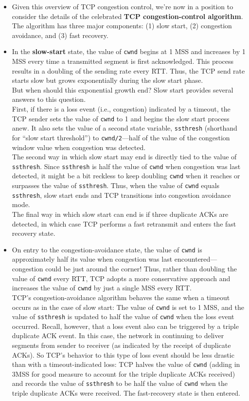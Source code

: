 \begin{itemize}
\item
Given this overview of TCP congestion control, we're now in a position to consider the details of the celebrated \textbf{TCP congestion-control algorithm}. The algorithm has three major components: (1) slow start, (2) congestion avoidance, and (3) fast recovery.

\item
In the \textbf{slow-start} state, the value of \texttt{cwnd} begins at 1 MSS and increases by 1 MSS every time a transmitted segment is first acknowledged. This process results in a doubling of the sending rate every RTT. Thus, the TCP send rate starts slow but grows exponentially during the slow start phase.\\
But when should this exponential growth end? Slow start provides several answers to this question.\\
First, if there is a loss event (i.e., congestion) indicated by a timeout, the TCP sender sets the value of \texttt{cwnd} to 1 and begins the slow start process anew. It also sets the value of a second state variable, \texttt{ssthresh} (shorthand for ``slow start threshold'') to \texttt{cwnd/2}---half of the value of the congestion window value when congestion was detected.\\
The second way in which slow start may end is directly tied to the value of \texttt{ssthresh}. Since \texttt{ssthresh} is half the value of \texttt{cwnd} when congestion was last detected, it might be a bit reckless to keep doubling \texttt{cwnd} when it reaches or surpasses the value of \texttt{ssthresh}. Thus, when the value of \texttt{cwnd} equals \texttt{ssthresh}, slow start ends and TCP transitions into congestion avoidance mode.\\
The final way in which slow start can end is if three duplicate ACKs are detected, in which case TCP performs a fast retransmit and enters the fast recovery state.

\item
On entry to the congestion-avoidance state, the value of \texttt{cwnd} is approximately half its value when congestion was last encountered---congestion could be just around the corner! Thus, rather than doubling the value of \texttt{cwnd} every RTT, TCP adopts a more conservative approach and increases the value of \texttt{cwnd} by just a single MSS every RTT.\\
TCP's congestion-avoidance algorithm behaves the same when a timeout occurs as in the case of slow start: The value of \texttt{cwnd} is set to 1 MSS, and the value of \texttt{ssthresh} is updated to half the value of \texttt{cwnd} when the loss event occurred. Recall, however, that a loss event also can be triggered by a triple duplicate ACK event. In this case, the network in continuing to deliver segments from sender to receiver (as indicated by the receipt of duplicate ACKs). So TCP's behavior to this type of loss event should be less drastic than with a timeout-indicated loss: TCP halves the value of \texttt{cwnd} (adding in 3MSS for good measure to account for the triple duplicate ACKs received) and records the value of \texttt{ssthresh} to be half the value of \texttt{cwnd} when the triple duplicate ACKs were received. The fast-recovery state is then entered.


\end{itemize}
